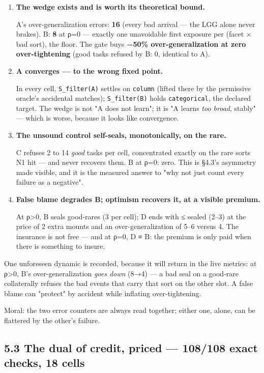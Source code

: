 \documentclass[11pt]{article}
\begin{document}
\begin{enumerate}
\item \textbf{The wedge exists and is worth its theoretical bound.} \par A's over-generalization errors: \textbf{16} (every bad arrival — the LGG alone never brakes). B: \textbf{8} at ρ=0 — exactly one unavoidable first exposure per (facet × bad sort), the floor. The gate buys \textbf{−50\% over-generalization at zero over-tightening} (good tasks refused by B: 0, identical to A).

\item \textbf{A converges — to the wrong fixed point.} \par In every cell, \texttt{S\_filter(A)} settles on \texttt{column} (lifted there by the permissive oracle's accidental matches); \texttt{S\_filter(B)} holds \texttt{categorical}, the declared target. The wedge is not "A does not learn"; it is "A learns \emph{too broad}, stably" — which is worse, because it looks like convergence.

\item \textbf{The unsound control self-seals, monotonically, on the rare.} \par C refuses 2 to 14 \emph{good} tasks per cell, concentrated exactly on the rare sorts N1 hit — and never recovers them. B at ρ=0: zero. This is §4.3's asymmetry made visible, and it is the measured answer to "why not just count every failure as a negative".

\item \textbf{False blame degrades B; optimism recovers it, at a visible premium.} \par At ρ>0, B seals good-rares (3 per cell); D ends with ≤ sealed (2–3) at the price of 2 extra mounts and an over-generalization of 5–6 versus 4. The insurance is not free — and at ρ=0, D ≡ B: the premium is only paid when there is something to insure.
\end{enumerate}

One unforeseen dynamic is recorded, because it will return in the live metrics: at ρ>0, B's over-generalization \emph{goes down} (8→4) — a bad seal on a good-rare collaterally refuses the bad events that carry that sort on the other slot. A false blame can "protect" by accident while inflating over-tightening.

Moral: the two error counters are always read together; either one, alone, can be flattered by the other's failure.

\subsection*{5.3 The dual of credit, priced — 108/108 exact checks, 18 cells}
\end{document}
